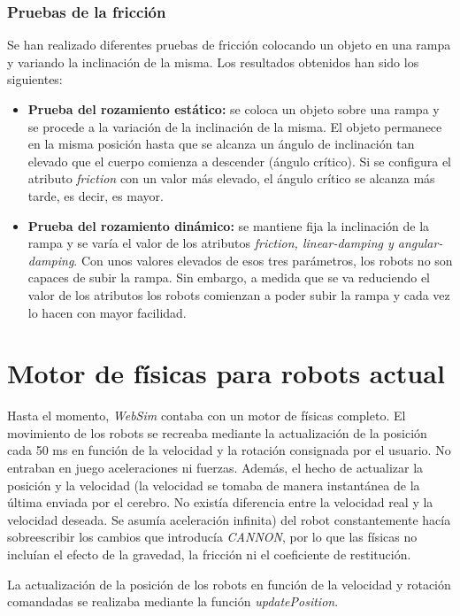 \subsubsection{Pruebas de la fricción}
Se han realizado diferentes pruebas de fricción colocando un objeto en una rampa y variando la inclinación de la misma. Los resultados obtenidos han sido los siguientes:
\begin{itemize}
    \item \textbf{Prueba del rozamiento estático: } se coloca un objeto sobre una rampa y se procede a la variación de la inclinación de la misma. El objeto permanece en la misma posición hasta que se alcanza un ángulo de inclinación tan elevado que el cuerpo comienza a descender (ángulo crítico). Si se configura el atributo \textit{friction} con un valor más elevado, el ángulo crítico se alcanza más tarde, es decir, es mayor.
    \item \textbf{Prueba del rozamiento dinámico: } se mantiene fija la inclinación de la rampa y se varía el valor de los atributos \textit{friction, linear-damping y angular-damping}. Con unos valores elevados de esos tres parámetros, los robots no son capaces de subir la rampa. Sin embargo, a medida que se va reduciendo el valor de los atributos los robots comienzan a poder subir la rampa y cada vez lo hacen con mayor facilidad.
\end{itemize}

\section{Motor de físicas para robots actual}
Hasta el momento, \textit{WebSim} contaba con un motor de físicas completo. El movimiento de los robots se recreaba mediante la actualización de la posición cada 50 ms en función de la velocidad y la rotación consignada por el usuario. No entraban en juego aceleraciones ni fuerzas. Además, el hecho de actualizar la posición y la velocidad (la velocidad se tomaba de manera instantánea de la última enviada por el cerebro. No existía diferencia entre la velocidad real y la velocidad deseada. Se asumía aceleración infinita) del robot constantemente hacía sobreescribir los cambios que introducía \textit{CANNON}, por lo que las físicas no incluían el efecto de la gravedad, la fricción ni el coeficiente de restitución. \newline 

La actualización de la posición de los robots en función de la velocidad y rotación comandadas se realizaba mediante la función \textit{updatePosition}.

